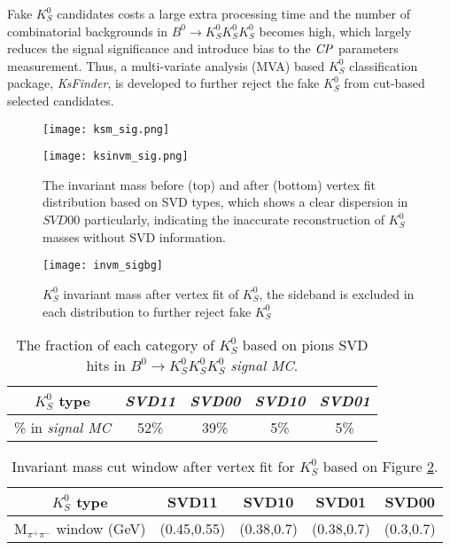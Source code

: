 Fake $K_S^0$ candidates costs a large extra processing time and the number of combinatorial backgrounds in $B^0 \to K_S^0  K_S^0  K_S^0$ becomes high, which largely reduces the signal significance and introduce bias to the $\it{CP}$ parameters measurement. Thus, a multi-variate analysis (MVA) based $K_S^0$ classification package, \textit{KsFinder}, is developed to further reject the fake $K_S^0$ from cut-based selected candidates.


\begin{figure}[htpb]
	\begin{minipage}[b]{1\linewidth}
		\centering 
		\texttt{[image: ksm\_sig.png]}
	\end{minipage}
	\begin{minipage}[b]{1\linewidth}
		\centering 
		\texttt{[image: ksinvm\_sig.png]}
	\end{minipage}
	\caption{The invariant mass before (top) and after (bottom) vertex fit distribution based on SVD types, which shows a clear dispersion in $SVD00$ particularly, indicating the inaccurate reconstruction of $K_S^0$ masses without SVD information.}
	\label{fig:invm1}
\end{figure}

\begin{figure}[htpb]
	\centering
	\texttt{[image: invm\_sigbg]}
	\caption{$K_S^0$ invariant mass after vertex fit of $K_S^0$, the sideband is excluded in each distribution to further reject fake $K_S^0$}
	\label{fig:invm}
\end{figure}

\begin{table}[H]
	\centering
	\begin{tabular}{|c|c|c|c|c|}
		\hline
		$K_S^0$ type & \textit{SVD11} & \textit{SVD00} & \textit{SVD10} & \textit{SVD01}\\
		\hline
		\% in \textit{signal MC} & 52\% & 39\% & 5\% & 5\%\\
		\hline
	\end{tabular}
	\caption{The fraction of each category of $K_S^0$ based on pions SVD hits in $B^0 \to K_S^0  K_S^0  K_S^0$ \textit{signal MC}.}
	\label{tab:svdxx}
\end{table}

\begin{table}[h]
	\centering 
	\begin{tabular}{|c|c|c|c|c|} 
		\hline
		$K_S^0$ type & SVD11 & SVD10 & SVD01  & SVD00  \\
		\hline
		M$_{\pi^+\pi^-}$ window (GeV) & (0.45,0.55) & (0.38,0.7)  & (0.38,0.7)  & (0.3,0.7) \\
		\hline
	\end{tabular}
	\caption{Invariant mass cut window after vertex fit for $K_S^0$ based on Figure \ref{fig:invm}.}
	\label{tab:ks_invm}
\end{table}



